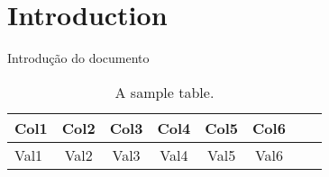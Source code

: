 \documentclass{article}
\newcommand{\RowStretch}[1]{\renewcommand{\arraystretch}{#1}}
\begin{document}


\tableofcontents

\section{Introduction}
\label{sec:introduction}
% 
Introdução do documento

\begin{table*}[ht]\centering
    \RowStretch{1.3}
    \begin{tabular}{@{}lccccccc@{}}\toprule
    Col1    & Col2  & Col3  & Col4  & Col5  & Col6 \\
    \midrule
    Val1    & Val2  & Val3  & Val4  & Val5  & Val6 \\
    \bottomrule
    \end{tabular}
    \caption{A sample table.}
    \label{tab:label}
\end{table*}
\end{document}

